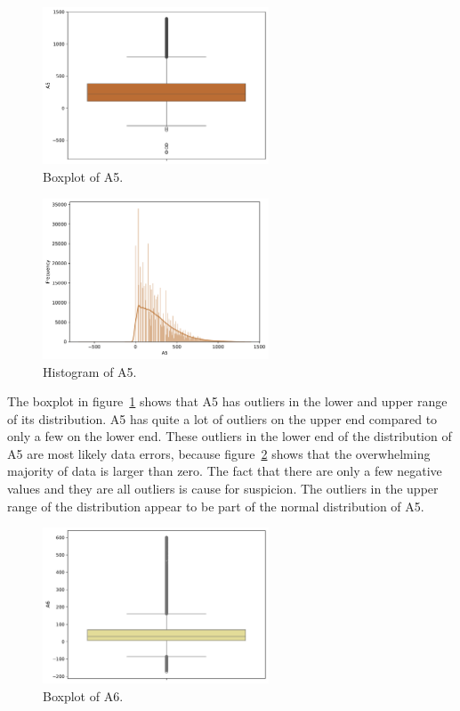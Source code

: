 \documentclass[11pt]{report}
\begin{document}
\begin{figure}[H]
    \centering
    \includegraphics[width=0.6\textwidth]{images/A5_boxplot.pdf}
    \caption{Boxplot of A5.}
    \label{fig:a5_boxplot}
\end{figure}


\begin{figure}[H]
    \centering
    \includegraphics[width=0.6\textwidth]{images/A5_histplot.pdf}
    \caption{Histogram of A5.}
    \label{fig:a5_histplot}
\end{figure}

The boxplot in figure~\ref{fig:a5_boxplot} shows that A5 has outliers in the lower and upper range of its distribution. A5 has quite a lot of outliers on the upper end compared to only a few on the lower end. These outliers in the lower end of the distribution of A5 are most likely data errors, because figure~\ref{fig:a5_histplot} shows that the overwhelming majority of data is larger than zero. The fact that there are only a few negative values and they are all outliers is cause for suspicion. The outliers in the upper range of the distribution appear to be part of the normal distribution of A5.

\begin{figure}[H]
    \centering
    \includegraphics[width=0.6\textwidth]{images/A6_boxplot.pdf}
    \caption{Boxplot of A6.}
    \label{fig:a6_boxplot}
\end{figure}
\end{document}
